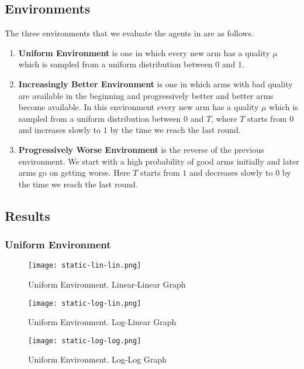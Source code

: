 \subsection{Environments}
The three environments that we evaluate the agents in are as follows.

\begin{enumerate}
    \item \textbf{Uniform Environment} is one in which every new arm has a quality $\mu$ which is sampled from a uniform distribution between $0$ and $1$.
    \item \textbf{Increasingly Better Environment} is one in which arms with bad quality are available in the beginning and progressively better and better arms become available. In this environment every new arm has a quality $\mu$ which is sampled from a uniform distribution between $0$ and $T$, where $T$ starts from $0$ and increases slowly to $1$ by the time we reach the last round. 
    \item \textbf{Progressively Worse Environment} is the reverse of the previous environment. We start with a high probability of good arms initially and later arms go on getting worse. Here $T$ starts from $1$ and decreases slowly to $0$ by the time we reach the last round. 
\end{enumerate}

\subsection{Results}

\subsubsection{Uniform Environment}
\begin{figure}[ht]
    \centering
    \texttt{[image: static-lin-lin.png]}
    \caption{Uniform Environment. Linear-Linear Graph}
    \label{fig:u1}
\end{figure}

\begin{figure}[h!]
    \centering
    \texttt{[image: static-log-lin.png]}
    \caption{Uniform Environment. Log-Linear Graph}
    \label{fig:u2}
\end{figure}

\begin{figure}[h!]
    \centering
    \texttt{[image: static-log-log.png]}
    \caption{Uniform Environment. Log-Log Graph}
    \label{fig:u3}
\end{figure}

